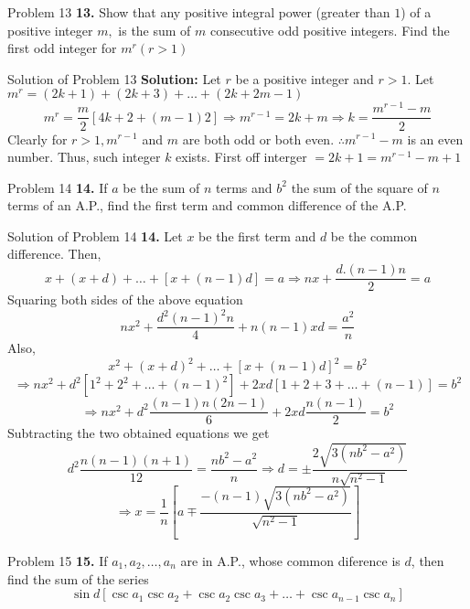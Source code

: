 \documentclass[aspectratio=1610,8pt]{beamer}
\begin{document}
\begin{frame}{Problem 13}
  \textbf{13.} Show that any positive integral power (greater than $1$) of a positive integer $m,$ is the sum of $m$ consecutive
  odd positive integers. Find the first odd integer for $m^r(r > 1)$
\end{frame}
\begin{frame}{Solution of Problem 13}
  \textbf{Solution:} Let $r$ be a positive integer and $r > 1.$
  \linebreak\linebreak
  Let $m^r = (2k + 1)+ (2k + 3) + \ldots + (2k + 2m - 1)$
  $$m^r = \frac{m}{2}[4k + 2 + (m - 1)2] \Rightarrow m^{r - 1} = 2k + m \Rightarrow k = \frac{m^{r - 1} - m}{2}$$
  Clearly for $r > 1, m^{r - 1}$ and $m$ are both odd or both even. $\therefore m^{r - 1} - m$ is an even number. Thus, such
  integer $k$ exists.
  \linebreak\linebreak
  First off interger $= 2k + 1 = m^{r - 1} - m + 1$
\end{frame}
\begin{frame}{Problem 14}
  \textbf{14.} If $a$ be the sum of $n$ terms and $b^2$ the sum of the square of $n$ terms of an A.P., find the first term and
  common difference of the A.P.
\end{frame}
\begin{frame}{Solution of Problem 14}
  \textbf{14.} Let $x$ be the first term and $d$ be the common difference. Then,
  $$x + (x + d) + \ldots + [x + (n - 1)d] = a \Rightarrow nx + \frac{d.(n - 1)n}{2} = a$$
  Squaring both sides of the above equation
  $$nx^2 + \frac{d^2(n - 1)^2n}{4} + n(n - 1)xd = \frac{a^2}{n}$$
  Also,
  $$x^2 + (x + d)^2 + \ldots + [x + (n - 1)d]^2 = b^2$$
  $$\Rightarrow nx^2 + d^2[1^2 + 2^2 + \ldots + (n - 1)^2] + 2xd[1 + 2 + 3 + \ldots + (n - 1)]= b^2$$
  $$\Rightarrow nx^2 + d^2\frac{(n - 1)n(2n - 1)}{6} + 2xd\frac{n(n - 1)}{2} = b^2$$
  Subtracting the two obtained equations we get
  $$d^2\frac{n(n - 1)(n + 1)}{12} = \frac{nb^2 - a^2}{n}\Rightarrow d = \pm \frac{2\sqrt{3(nb^2 - a^2)}}{n\sqrt{n^2 - 1}}$$
  $$\Rightarrow x = \frac{1}{n}\left[a\mp \frac{-(n - 1)\sqrt{3(nb^2 - a^2)}}{\sqrt{n^2 - 1}}\right]$$
\end{frame}
\begin{frame}{Problem 15}
  \textbf{15.} If $a_1, a_2, \ldots, a_n$ are in A.P., whose common diference is $d$, then find the sum of the series $$\sin
  d[\csc a_1\csc a_2 + \csc a_2\csc a_3 + \ldots + \csc a_{n - 1}\csc a_n]$$
\end{frame}
\end{document}

